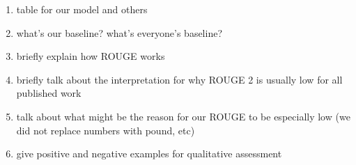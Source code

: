 \begin{enumerate}
\item table for our model and others
\item what's our baseline? what's everyone's baseline?
\item briefly explain how ROUGE works
\item briefly talk about the interpretation for why ROUGE 2 is usually low for all published work
\item talk about what might be the reason for our ROUGE to be especially low (we did not replace numbers with pound, etc)
\item give positive and negative examples for qualitative assessment
\end{enumerate}
